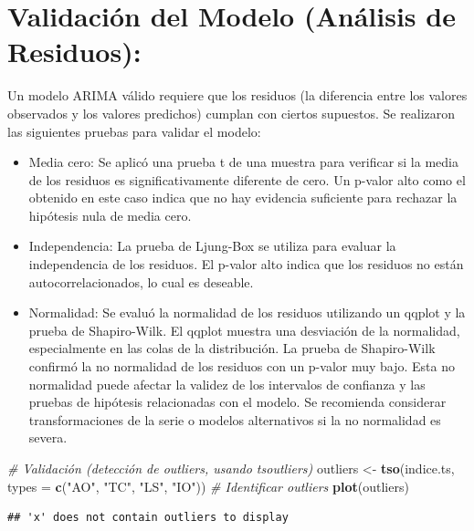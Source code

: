 \documentclass[
]{book}
\newenvironment{Shaded}{\begin{snugshade}}{\end{snugshade}}
\newcommand{\AttributeTok}[1]{\textcolor[rgb]{0.13,0.29,0.53}{#1}}
\newcommand{\CommentTok}[1]{\textcolor[rgb]{0.56,0.35,0.01}{\textit{#1}}}
\newcommand{\FunctionTok}[1]{\textcolor[rgb]{0.13,0.29,0.53}{\textbf{#1}}}
\newcommand{\NormalTok}[1]{#1}
\newcommand{\OtherTok}[1]{\textcolor[rgb]{0.56,0.35,0.01}{#1}}
\newcommand{\StringTok}[1]{\textcolor[rgb]{0.31,0.60,0.02}{#1}}
\begin{document}
\section{Validación del Modelo (Análisis de Residuos):}\label{validaciuxf3n-del-modelo-anuxe1lisis-de-residuos}

Un modelo ARIMA válido requiere que los residuos (la diferencia entre los valores observados y los valores predichos) cumplan con ciertos supuestos. Se realizaron las siguientes pruebas para validar el modelo:

\begin{itemize}
\item
  Media cero: Se aplicó una prueba t de una muestra para verificar si la media de los residuos es significativamente diferente de cero. Un p-valor alto como el obtenido en este caso indica que no hay evidencia suficiente para rechazar la hipótesis nula de media cero.
\item
  Independencia: La prueba de Ljung-Box se utiliza para evaluar la independencia de los residuos. El p-valor alto indica que los residuos no están autocorrelacionados, lo cual es deseable.
\item
  Normalidad: Se evaluó la normalidad de los residuos utilizando un qqplot y la prueba de Shapiro-Wilk. El qqplot muestra una desviación de la normalidad, especialmente en las colas de la distribución. La prueba de Shapiro-Wilk confirmó la no normalidad de los residuos con un p-valor muy bajo. Esta no normalidad puede afectar la validez de los intervalos de confianza y las pruebas de hipótesis relacionadas con el modelo. Se recomienda considerar transformaciones de la serie o modelos alternativos si la no normalidad es severa.
\end{itemize}

\begin{Shaded}
\begin{Highlighting}[]
\CommentTok{\# Validación (detección de outliers, usando \textquotesingle{}tsoutliers\textquotesingle{})}
\NormalTok{outliers }\OtherTok{\textless{}{-}} \FunctionTok{tso}\NormalTok{(indice.ts, }\AttributeTok{types =} \FunctionTok{c}\NormalTok{(}\StringTok{"AO"}\NormalTok{, }\StringTok{"TC"}\NormalTok{, }\StringTok{"LS"}\NormalTok{, }\StringTok{"IO"}\NormalTok{))  }\CommentTok{\# Identificar outliers}
\FunctionTok{plot}\NormalTok{(outliers)}
\end{Highlighting}
\end{Shaded}

\begin{verbatim}
## 'x' does not contain outliers to display
\end{verbatim}
\end{document}
